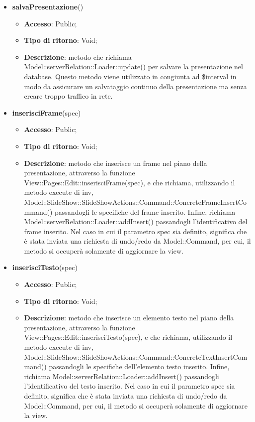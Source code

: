 {{\begin{itemize}
\begin{itemize}
		\end{itemize}
		\item \textbf{salvaPresentazione}()
		\begin{itemize}
			\item \textbf{Accesso}: Public;
			\item \textbf{Tipo di ritorno}: Void;
			\item \textbf{Descrizione}: metodo che richiama Model::\-serverRelation::\-Loader::\-update() per salvare la presentazione nel database. Questo metodo viene utilizzato in congiunta ad \$interval in modo da assicurare un salvataggio continuo della presentazione ma senza creare troppo traffico in rete.
		\end{itemize}
		\item \textbf{inserisciFrame}(spec)
		\begin{itemize}
			\item \textbf{Accesso}: Public;
			\item \textbf{Tipo di ritorno}: Void;
			\item \textbf{Descrizione}: metodo che inserisce un frame nel piano della presentazione, attraverso la funzione View::Pages::Edit::inserisciFrame(spec), e che richiama, utilizzando il metodo execute di inv, Model::\-SlideShow::\-SlideShowActions::\-Command::\-ConcreteFrameInsertCommand() passandogli le specifiche del frame inserito. Infine, richiama Model::\-serverRelation::\-Loader::\-addInsert() passandogli l'identificativo del frame inserito. Nel caso in cui il parametro spec sia definito, significa che è stata inviata una richiesta di undo/redo da Model::\-Command, per cui, il metodo si occuperà solamente di aggiornare la view.
		\end{itemize}
		\item \textbf{inserisciTesto}(spec)
		\begin{itemize}
			\item \textbf{Accesso}: Public;
			\item \textbf{Tipo di ritorno}: Void;
			\item \textbf{Descrizione}: metodo che inserisce un elemento testo nel piano della presentazione, attraverso la funzione View::Pages::Edit::inserisciTesto(spec), e che richiama, utilizzando il metodo execute di inv, Model::\-SlideShow::\-SlideShowActions::\-Command::\-ConcreteTextInsertCommand() passandogli le specifiche dell'elemento testo inserito. Infine, richiama Model::\-serverRelation::\-Loader::\-addInsert() passandogli l'identificativo del testo inserito. Nel caso in cui il parametro spec sia definito, significa che è stata inviata una richiesta di undo/redo da Model::\-Command, per cui, il metodo si occuperà solamente di aggiornare la view.

\end{itemize}
\end{itemize}}}
